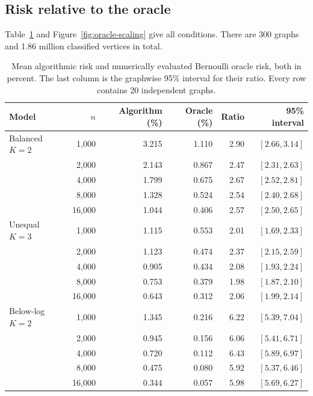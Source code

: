 \subsection{Risk relative to the oracle}
Table~\ref{tab:oracle-scaling} and Figure~\ref{fig:oracle-scaling} give all conditions. There are 300 graphs and 1.86 million classified vertices in total.
\begin{table}[!htbp]
\centering
\small
\caption{Mean algorithmic risk and numerically evaluated Bernoulli oracle risk, both in percent. The last column is the graphwise 95\% interval for their ratio. Every row contains 20 independent graphs.}\label{tab:oracle-scaling}
\begin{tabular}{@{}lrrrrr@{}}
\toprule
Model & $n$ & Algorithm (\%) & Oracle (\%) & Ratio & 95\% interval\\
\midrule
\addlinespace
Balanced $K=2$ & 1,000 & 3.215 & 1.110 & 2.90 & $[2.66,3.14]$ \\
 & 2,000 & 2.143 & 0.867 & 2.47 & $[2.31,2.63]$ \\
 & 4,000 & 1.799 & 0.675 & 2.67 & $[2.52,2.81]$ \\
 & 8,000 & 1.328 & 0.524 & 2.54 & $[2.40,2.68]$ \\
 & 16,000 & 1.044 & 0.406 & 2.57 & $[2.50,2.65]$ \\
\addlinespace
Unequal $K=3$ & 1,000 & 1.115 & 0.553 & 2.01 & $[1.69,2.33]$ \\
 & 2,000 & 1.123 & 0.474 & 2.37 & $[2.15,2.59]$ \\
 & 4,000 & 0.905 & 0.434 & 2.08 & $[1.93,2.24]$ \\
 & 8,000 & 0.753 & 0.379 & 1.98 & $[1.87,2.10]$ \\
 & 16,000 & 0.643 & 0.312 & 2.06 & $[1.99,2.14]$ \\
\addlinespace
Below-log $K=2$ & 1,000 & 1.345 & 0.216 & 6.22 & $[5.39,7.04]$ \\
 & 2,000 & 0.945 & 0.156 & 6.06 & $[5.41,6.71]$ \\
 & 4,000 & 0.720 & 0.112 & 6.43 & $[5.89,6.97]$ \\
 & 8,000 & 0.475 & 0.080 & 5.92 & $[5.37,6.46]$ \\
 & 16,000 & 0.344 & 0.057 & 5.98 & $[5.69,6.27]$ \\
\bottomrule
\end{tabular}
\end{table}
